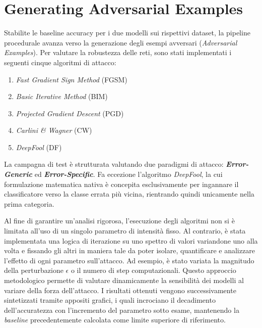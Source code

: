 \documentclass[a4paper, 12pt]{article}
\begin{document}
\clearpage
\section{Generating Adversarial Examples}
Stabilite le baseline accuracy per i due modelli sui rispettivi dataset, la pipeline procedurale avanza verso la generazione degli esempi avversari (\textit{Adversarial Examples}). Per valutare la robustezza delle reti, sono stati implementati i seguenti cinque algoritmi di attacco:
\begin{enumerate}
    \item \textit{Fast Gradient Sign Method} (FGSM)
    \item \textit{Basic Iterative Method} (BIM)
    \item \textit{Projected Gradient Descent} (PGD)
    \item \textit{Carlini \& Wagner} (CW)
    \item \textit{DeepFool} (DF)
\end{enumerate}

La campagna di test è strutturata valutando due paradigmi di attacco: \textit{\textbf{Error-Generic}} ed \textit{\textbf{Error-Specific}}. Fa eccezione l'algoritmo \textit{DeepFool}, la cui formulazione matematica nativa è concepita esclusivamente per ingannare il classificatore verso la classe errata più vicina, rientrando quindi unicamente nella prima categoria.

Al fine di garantire un'analisi rigorosa, l'esecuzione degli algoritmi non si è limitata all'uso di un singolo parametro di intensità fisso. 
Al contrario, è stata implementata una logica di iterazione su uno spettro di valori variandone uno alla volta e fissando 
gli altri in maniera tale da poter isolare, quantificare e analizzare 
l'effetto di ogni parametro sull'attacco. Ad esempio, è stato variata la magnitudo della perturbazione $\epsilon$ o 
il numero di step computazionali. Questo approccio metodologico permette di valutare dinamicamente la sensibilità dei modelli al variare della forza 
dell'attacco. I risultati ottenuti vengono successivamente sintetizzati tramite appositi grafici, i quali incrociano il decadimento dell'accuratezza con 
l'incremento del parametro sotto esame, mantenendo la \textit{baseline} precedentemente calcolata come limite superiore di riferimento.
\end{document}
